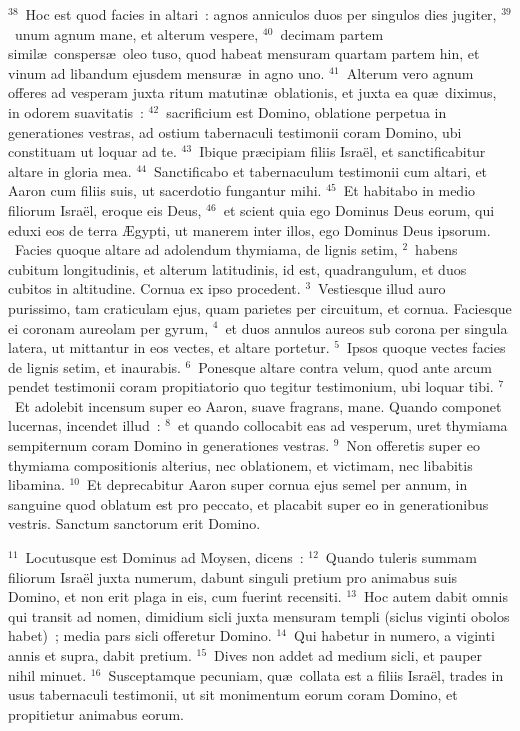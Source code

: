 ${}^{38}$~Hoc est quod facies in altari~: agnos anniculos duos per singulos dies jugiter,
${}^{39}$~unum agnum mane, et alterum vespere,
${}^{40}$~decimam partem simil\ae\ conspers\ae\ oleo tuso, quod habeat mensuram quartam partem hin, et vinum ad libandum ejusdem mensur\ae\ in agno uno.
${}^{41}$~Alterum vero agnum offeres ad vesperam juxta ritum matutin\ae\ oblationis, et juxta ea qu\ae\ diximus, in odorem suavitatis~:
${}^{42}$~sacrificium est Domino, oblatione perpetua in generationes vestras, ad ostium tabernaculi testimonii coram Domino, ubi constituam ut loquar ad te.
${}^{43}$~Ibique pr\ae cipiam filiis Isra\"el, et sanctificabitur altare in gloria mea.
${}^{44}$~Sanctificabo et tabernaculum testimonii cum altari, et Aaron cum filiis suis, ut sacerdotio fungantur mihi.
${}^{45}$~Et habitabo in medio filiorum Isra\"el, eroque eis Deus,
${}^{46}$~et scient quia ego Dominus Deus eorum, qui eduxi eos de terra \AE gypti, ut manerem inter illos, ego Dominus Deus ipsorum.
~\lettrine[lines=10,image=true,loversize=0.05,lraise=-0.03]{F}{}acies quoque altare ad adolendum thymiama, de lignis setim,
${}^{2}$~habens cubitum longitudinis, et alterum latitudinis, id est, quadrangulum, et duos cubitos in altitudine. Cornua ex ipso procedent.
${}^{3}$~Vestiesque illud auro purissimo, tam craticulam ejus, quam parietes per circuitum, et cornua. Faciesque ei coronam aureolam per gyrum,
${}^{4}$~et duos annulos aureos sub corona per singula latera, ut mittantur in eos vectes, et altare portetur.
${}^{5}$~Ipsos quoque vectes facies de lignis setim, et inaurabis.
${}^{6}$~Ponesque altare contra velum, quod ante arcum pendet testimonii coram propitiatorio quo tegitur testimonium, ubi loquar tibi.
${}^{7}$~Et adolebit incensum super eo Aaron, suave fragrans, mane. Quando componet lucernas, incendet illud~:
${}^{8}$~et quando collocabit eas ad vesperum, uret thymiama sempiternum coram Domino in generationes vestras.
${}^{9}$~Non offeretis super eo thymiama compositionis alterius, nec oblationem, et victimam, nec libabitis libamina.
${}^{10}$~Et deprecabitur Aaron super cornua ejus semel per annum, in sanguine quod oblatum est pro peccato, et placabit super eo in generationibus vestris. Sanctum sanctorum erit Domino.


${}^{11}$~Locutusque est Dominus ad Moysen, dicens~:
${}^{12}$~Quando tuleris summam filiorum Isra\"el juxta numerum, dabunt singuli pretium pro animabus suis Domino, et non erit plaga in eis, cum fuerint recensiti.
${}^{13}$~Hoc autem dabit omnis qui transit ad nomen, dimidium sicli juxta mensuram templi (siclus viginti obolos habet)~; media pars sicli offeretur Domino.
${}^{14}$~Qui habetur in numero, a viginti annis et supra, dabit pretium.
${}^{15}$~Dives non addet ad medium sicli, et pauper nihil minuet.
${}^{16}$~Susceptamque pecuniam, qu\ae\ collata est a filiis Isra\"el, trades in usus tabernaculi testimonii, ut sit monimentum eorum coram Domino, et propitietur animabus eorum.


